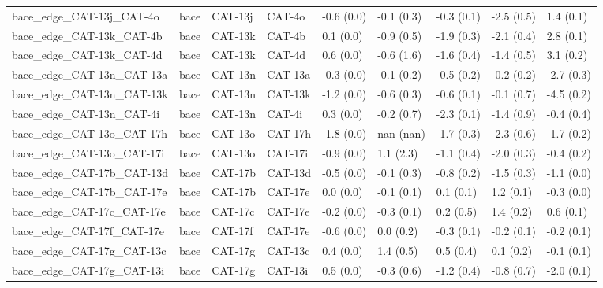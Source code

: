 \begin{tabular}{lllllllll}
bace\_edge\_CAT-13j\_CAT-4o         &      bace &     CAT-13j &      CAT-4o &  -0.6 (0.0) &        -0.1 (0.3) &  -0.3 (0.1) &  -2.5 (0.5) &   1.4 (0.1) \\
bace\_edge\_CAT-13k\_CAT-4b         &      bace &     CAT-13k &      CAT-4b &   0.1 (0.0) &        -0.9 (0.5) &  -1.9 (0.3) &  -2.1 (0.4) &   2.8 (0.1) \\
bace\_edge\_CAT-13k\_CAT-4d         &      bace &     CAT-13k &      CAT-4d &   0.6 (0.0) &        -0.6 (1.6) &  -1.6 (0.4) &  -1.4 (0.5) &   3.1 (0.2) \\
bace\_edge\_CAT-13n\_CAT-13a        &      bace &     CAT-13n &     CAT-13a &  -0.3 (0.0) &        -0.1 (0.2) &  -0.5 (0.2) &  -0.2 (0.2) &  -2.7 (0.3) \\
bace\_edge\_CAT-13n\_CAT-13k        &      bace &     CAT-13n &     CAT-13k &  -1.2 (0.0) &        -0.6 (0.3) &  -0.6 (0.1) &  -0.1 (0.7) &  -4.5 (0.2) \\
bace\_edge\_CAT-13n\_CAT-4i         &      bace &     CAT-13n &      CAT-4i &   0.3 (0.0) &        -0.2 (0.7) &  -2.3 (0.1) &  -1.4 (0.9) &  -0.4 (0.4) \\
bace\_edge\_CAT-13o\_CAT-17h        &      bace &     CAT-13o &     CAT-17h &  -1.8 (0.0) &         nan (nan) &  -1.7 (0.3) &  -2.3 (0.6) &  -1.7 (0.2) \\
bace\_edge\_CAT-13o\_CAT-17i        &      bace &     CAT-13o &     CAT-17i &  -0.9 (0.0) &         1.1 (2.3) &  -1.1 (0.4) &  -2.0 (0.3) &  -0.4 (0.2) \\
bace\_edge\_CAT-17b\_CAT-13d        &      bace &     CAT-17b &     CAT-13d &  -0.5 (0.0) &        -0.1 (0.3) &  -0.8 (0.2) &  -1.5 (0.3) &  -1.1 (0.0) \\
bace\_edge\_CAT-17b\_CAT-17e        &      bace &     CAT-17b &     CAT-17e &   0.0 (0.0) &        -0.1 (0.1) &   0.1 (0.1) &   1.2 (0.1) &  -0.3 (0.0) \\
bace\_edge\_CAT-17c\_CAT-17e        &      bace &     CAT-17c &     CAT-17e &  -0.2 (0.0) &        -0.3 (0.1) &   0.2 (0.5) &   1.4 (0.2) &   0.6 (0.1) \\
bace\_edge\_CAT-17f\_CAT-17e        &      bace &     CAT-17f &     CAT-17e &  -0.6 (0.0) &         0.0 (0.2) &  -0.3 (0.1) &  -0.2 (0.1) &  -0.2 (0.1) \\
bace\_edge\_CAT-17g\_CAT-13c        &      bace &     CAT-17g &     CAT-13c &   0.4 (0.0) &         1.4 (0.5) &   0.5 (0.4) &   0.1 (0.2) &  -0.1 (0.1) \\
bace\_edge\_CAT-17g\_CAT-13i        &      bace &     CAT-17g &     CAT-13i &   0.5 (0.0) &        -0.3 (0.6) &  -1.2 (0.4) &  -0.8 (0.7) &  -2.0 (0.1) \\

\end{tabular}
